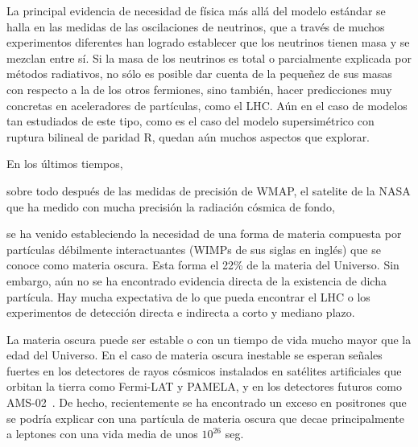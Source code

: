 La principal evidencia de necesidad de física más allá del modelo
estándar se halla en las medidas de las oscilaciones de neutrinos, que
a través de muchos experimentos diferentes han logrado establecer que
los neutrinos tienen masa y se mezclan entre sí. Si la masa de los
neutrinos es total o parcialmente explicada por métodos radiativos, no
sólo es posible dar cuenta de la pequeñez de sus masas con respecto a
la de los otros fermiones, sino también, hacer predicciones muy
concretas en aceleradores de partículas, como el LHC. Aún en el caso
de modelos tan estudiados de este tipo, como es el caso del modelo
supersimétrico con ruptura bilineal de paridad R, quedan aún muchos
aspectos que explorar.

En los últimos tiempos,
\begin{soloproyecto}
sobre todo después de las medidas de
precisión de WMAP, el satelite de la NASA que ha medido con mucha
precisión la radiación cósmica de fondo,  
\end{soloproyecto}
se ha venido estableciendo la necesidad de una forma de materia
compuesta por partículas débilmente interactuantes (WIMPs de sus
siglas en inglés) que se conoce como materia oscura. Esta forma el
22\% de la materia del Universo. Sin embargo, aún no se ha encontrado
evidencia directa de la existencia de dicha partícula. Hay mucha
expectativa de lo que pueda encontrar el LHC o los experimentos de
detección directa e indirecta a corto y mediano plazo.

La materia oscura puede ser estable o con un tiempo de vida mucho
mayor que la edad del Universo. En el caso de materia oscura inestable
se esperan señales fuertes en los detectores de rayos cósmicos
instalados en satélites artificiales que orbitan la tierra como
Fermi-LAT y PAMELA, y en los detectores futuros como
AMS-02~\cite{ams:2009}. De hecho, recientemente se ha encontrado un
exceso en positrones \cite{Adriani:2008zr} que se podría explicar con
una partícula de materia oscura que decae principalmente a leptones
con una vida media de unos $10^{26}$ seg.

